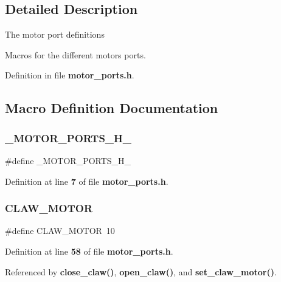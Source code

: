 \subsection{Detailed Description}
The motor port definitions

Macros for the different motors ports. 



Definition in file \textbf{ motor\+\_\+ports.\+h}.



\subsection{Macro Definition Documentation}
\mbox{\label{motor__ports_8h_a96b0e64c39730b0c4ca0d9e493bc0f58}} 
\subsubsection{\+\_\+\+M\+O\+T\+O\+R\+\_\+\+P\+O\+R\+T\+S\+\_\+\+H\+\_\+}
{\footnotesize\ttfamily \#define \+\_\+\+M\+O\+T\+O\+R\+\_\+\+P\+O\+R\+T\+S\+\_\+\+H\+\_\+}



Definition at line \textbf{ 7} of file \textbf{ motor\+\_\+ports.\+h}.

\mbox{\label{motor__ports_8h_aa3bcf05406f673f735df023643f347bb}} 
\subsubsection{C\+L\+A\+W\+\_\+\+M\+O\+T\+OR}
{\footnotesize\ttfamily \#define C\+L\+A\+W\+\_\+\+M\+O\+T\+OR~10}



Definition at line \textbf{ 58} of file \textbf{ motor\+\_\+ports.\+h}.



Referenced by \textbf{ close\+\_\+claw()}, \textbf{ open\+\_\+claw()}, and \textbf{ set\+\_\+claw\+\_\+motor()}.

